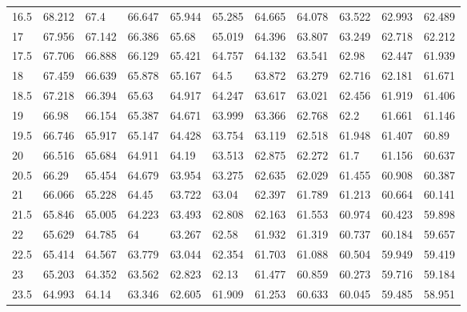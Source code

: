 \begin{bibunit}
\begin{table}[]
\begin{tabular}{lllllllllll}
			16.5 & 68.212 & 67.4   & 66.647 & 65.944 & 65.285 & 64.665 & 64.078 & 63.522 & 62.993 & 62.489 \\
			17   & 67.956 & 67.142 & 66.386 & 65.68  & 65.019 & 64.396 & 63.807 & 63.249 & 62.718 & 62.212 \\
			17.5 & 67.706 & 66.888 & 66.129 & 65.421 & 64.757 & 64.132 & 63.541 & 62.98  & 62.447 & 61.939 \\
			18   & 67.459 & 66.639 & 65.878 & 65.167 & 64.5   & 63.872 & 63.279 & 62.716 & 62.181 & 61.671 \\
			18.5 & 67.218 & 66.394 & 65.63  & 64.917 & 64.247 & 63.617 & 63.021 & 62.456 & 61.919 & 61.406 \\
			19   & 66.98  & 66.154 & 65.387 & 64.671 & 63.999 & 63.366 & 62.768 & 62.2   & 61.661 & 61.146 \\
			19.5 & 66.746 & 65.917 & 65.147 & 64.428 & 63.754 & 63.119 & 62.518 & 61.948 & 61.407 & 60.89  \\
			20   & 66.516 & 65.684 & 64.911 & 64.19  & 63.513 & 62.875 & 62.272 & 61.7   & 61.156 & 60.637 \\
			20.5 & 66.29  & 65.454 & 64.679 & 63.954 & 63.275 & 62.635 & 62.029 & 61.455 & 60.908 & 60.387 \\
			21   & 66.066 & 65.228 & 64.45  & 63.722 & 63.04  & 62.397 & 61.789 & 61.213 & 60.664 & 60.141 \\
			21.5 & 65.846 & 65.005 & 64.223 & 63.493 & 62.808 & 62.163 & 61.553 & 60.974 & 60.423 & 59.898 \\
			22   & 65.629 & 64.785 & 64     & 63.267 & 62.58  & 61.932 & 61.319 & 60.737 & 60.184 & 59.657 \\
			22.5 & 65.414 & 64.567 & 63.779 & 63.044 & 62.354 & 61.703 & 61.088 & 60.504 & 59.949 & 59.419 \\
			23   & 65.203 & 64.352 & 63.562 & 62.823 & 62.13  & 61.477 & 60.859 & 60.273 & 59.716 & 59.184 \\
			23.5 & 64.993 & 64.14  & 63.346 & 62.605 & 61.909 & 61.253 & 60.633 & 60.045 & 59.485 & 58.951 \\
		\midrule
	\end{tabular}
\end{table}


\end{bibunit}
